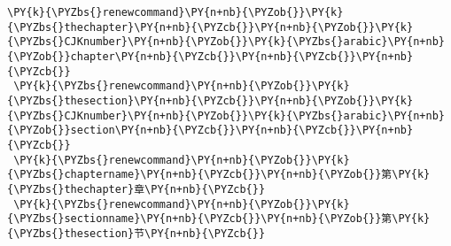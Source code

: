 \begin{Verbatim}[commandchars=\\\{\}]
 \PY{k}{\PYZbs{}renewcommand}\PY{n+nb}{\PYZob{}}\PY{k}{\PYZbs{}thechapter}\PY{n+nb}{\PYZcb{}}\PY{n+nb}{\PYZob{}}\PY{k}{\PYZbs{}CJKnumber}\PY{n+nb}{\PYZob{}}\PY{k}{\PYZbs{}arabic}\PY{n+nb}{\PYZob{}}chapter\PY{n+nb}{\PYZcb{}}\PY{n+nb}{\PYZcb{}}\PY{n+nb}{\PYZcb{}}
 \PY{k}{\PYZbs{}renewcommand}\PY{n+nb}{\PYZob{}}\PY{k}{\PYZbs{}thesection}\PY{n+nb}{\PYZcb{}}\PY{n+nb}{\PYZob{}}\PY{k}{\PYZbs{}CJKnumber}\PY{n+nb}{\PYZob{}}\PY{k}{\PYZbs{}arabic}\PY{n+nb}{\PYZob{}}section\PY{n+nb}{\PYZcb{}}\PY{n+nb}{\PYZcb{}}\PY{n+nb}{\PYZcb{}}
 \PY{k}{\PYZbs{}renewcommand}\PY{n+nb}{\PYZob{}}\PY{k}{\PYZbs{}chaptername}\PY{n+nb}{\PYZcb{}}\PY{n+nb}{\PYZob{}}第\PY{k}{\PYZbs{}thechapter}章\PY{n+nb}{\PYZcb{}}
 \PY{k}{\PYZbs{}renewcommand}\PY{n+nb}{\PYZob{}}\PY{k}{\PYZbs{}sectionname}\PY{n+nb}{\PYZcb{}}\PY{n+nb}{\PYZob{}}第\PY{k}{\PYZbs{}thesection}节\PY{n+nb}{\PYZcb{}}
\end{Verbatim}
